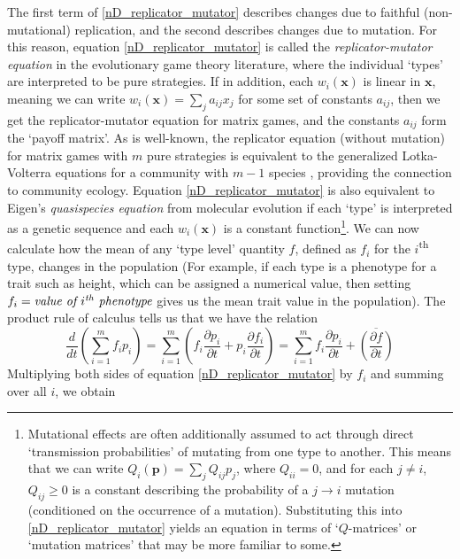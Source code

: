 The first term of \eqref{nD_replicator_mutator} describes changes due to faithful (non-mutational) replication, and the second describes changes due to mutation. For this reason, equation \eqref{nD_replicator_mutator} is called the \emph{replicator-mutator equation} in the evolutionary game theory literature, where the individual `types' are interpreted to be pure strategies. If in addition, each $w_i(\mathbf{x})$ is linear in $\mathbf{x}$, meaning we can write $w_i(\mathbf{x}) = \sum_{j}a_{ij}x_j$ for some set of constants $a_{ij}$, then we get the replicator-mutator equation for matrix games, and the constants $a_{ij}$ form the `payoff matrix'. As is well-known, the replicator equation (without mutation) for matrix games with $m$ pure strategies is equivalent to the generalized Lotka-Volterra equations for a community with $m-1$ species \citep{hofbauer_evolutionary_1998}, providing the connection to community ecology.  Equation \eqref{nD_replicator_mutator} is also equivalent to Eigen's \emph{quasispecies equation} from molecular evolution if each `type' is interpreted as a genetic sequence and each $w_i(\mathbf{x})$ is a constant function\footnote{Mutational effects are often additionally assumed to act through direct `transmission probabilities' of mutating from one type to another. This means that we can write $Q_i(\mathbf{p}) = \sum_j Q_{ij}p_j$, where $Q_{ii} = 0$, and for each $j \neq i$, $Q_{ij} \geq0$ is a constant describing the probability of a $j \to i$ mutation (conditioned on the occurrence of a mutation). Substituting this into \eqref{nD_replicator_mutator} yields an equation in terms of `$Q$-matrices' or `mutation matrices' that may be more familiar to some.}. We can now calculate how the mean of any `type level' quantity $f$, defined as $f_i$ for the $i$\textsuperscript{th} type, changes in the population (For example, if each type is a phenotype for a trait such as height, which can be assigned a numerical value, then setting $f_i = \textit{value of $i\textsuperscript{th}$ phenotype}$ gives us the mean trait value in the population). The product rule of calculus tells us that we have the relation
\begin{equation}
\label{product_rule_for_nD_price}
\frac{d}{dt}\left(\sum\limits_{i=1}^{m}f_ip_i\right) = \sum\limits_{i=1}^{m}\left(f_i\frac{\partial p_i}{\partial t} + p_i\frac{\partial f_i}{\partial t}\right) = \sum\limits_{i=1}^{m}f_i\frac{\partial p_i}{\partial t} + \overline{\left(\frac{\partial f}{\partial t}\right)}
\end{equation}
Multiplying both sides of equation \eqref{nD_replicator_mutator} by $f_i$ and summing over all $i$, we obtain
